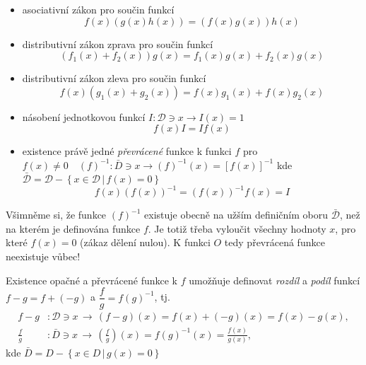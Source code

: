 {\begin{itemize}
          \begin{equation}\label{mai:eq021}
            f(x)g(x)=g(x)f(x)
          \end{equation}
        \item asociativní zákon pro součin funkcí 
          \begin{equation}\label{mai:eq022}
            f(x)(g(x)h(x))=(f(x)g(x))h(x)
          \end{equation}
        \item distributivní zákon zprava pro součin funkcí
          \begin{equation}\label{mai:eq023}
            (f_1(x) + f_2(x))g(x) =f_1(x)g(x) + f_2(x)g(x)
          \end{equation}
        \item distributivní zákon zleva pro součin funkcí
          \begin{equation}\label{mai:eq024}
            f(x)(g_1(x) + g_2(x))=f(x)g_1(x)+f(x)g_2(x)
          \end{equation}
        \item násobení jednotkovou funkcí \(I: \mathcal{D}\ni x \rightarrow I(x) = 1\)  
          \begin{equation}\label{mai:eq025}
           f(x)I=If(x)
          \end{equation}
        \item existence právě jedné \emph{převrácené} funkce k funkci \(f\) pro \(f(x)\neq0\quad 
              (f)^{-1}: \bar{D}\ni x\rightarrow (f)^{-1}(x)=[f(x)]^{-1}\) kde \(\bar{\mathcal{D}} 
              = \mathcal{D} - \left\{x\in \mathcal{D}\,|\,f(x)=0\right\}\)
          \begin{equation}
            f(x)(f(x))^{-1}=(f(x))^{-1}f(x) = I
          \end{equation}
      \end{itemize}
      Všimněme si, že funkce \((f)^{-1}\) existuje obecně na užším definičním oboru 
      \(\bar{\mathcal{D}}\), než na kterém je definována funkce \(f\). Je totiž třeba vyloučit 
      všechny hodnoty \(x\), pro které \(f(x) = 0\) (zákaz dělení nulou). K funkci \(O\) tedy 
      převrácená funkce neexistuje vůbec!
      
      Existence opačné a převrácené funkce k \(f\) umožňuje definovat \emph{rozdíl} a \emph{podíl} 
      funkcí \(f-g=f+(-g)\) a \(\dfrac{f}{g}=f(g)^{-1}\), tj.
      \begin{align*}
        f-g         &: \mathcal{D}\ni x\,\rightarrow\, (f-g)(x)=f(x)+(-g)(x)= f(x)-g(x), \\
        \frac{f}{g} &: \bar{D}\ni x\,\rightarrow\, 
                       \left(\frac{f}{g}\right)(x) = f(g)^{-1}(x) = \frac{f(x)}{g(x)}, 
      \end{align*}
      kde \(\bar{D}=D-\left\{x\in D\,|\,g(x)=0 \right\}\) 
      
}
